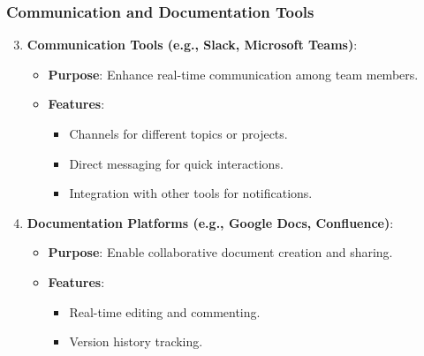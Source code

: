 \documentclass[aspectratio=169]{beamer}
\begin{document}
\begin{frame}[fragile]
    \frametitle{Communication and Documentation Tools}
    \begin{enumerate}
        \setcounter{enumi}{2} %
        \item \textbf{Communication Tools (e.g., Slack, Microsoft Teams)}:
        \begin{itemize}
            \item \textbf{Purpose}: Enhance real-time communication among team members.
            \item \textbf{Features}:
            \begin{itemize}
                \item Channels for different topics or projects.
                \item Direct messaging for quick interactions.
                \item Integration with other tools for notifications.
            \end{itemize}
        \end{itemize}
        
        \item \textbf{Documentation Platforms (e.g., Google Docs, Confluence)}:
        \begin{itemize}
            \item \textbf{Purpose}: Enable collaborative document creation and sharing.
            \item \textbf{Features}:
            \begin{itemize}
                \item Real-time editing and commenting.
                \item Version history tracking.
            \end{itemize}
        \end{itemize}
    \end{enumerate}
\end{frame}
\end{document}
